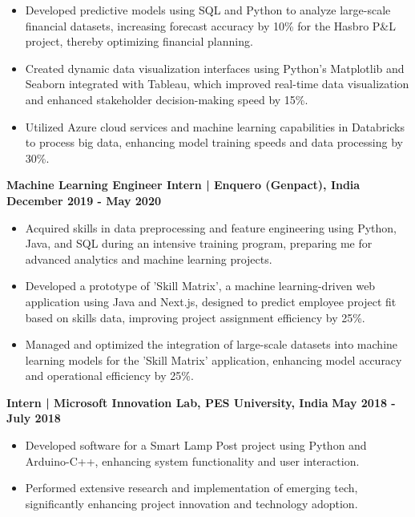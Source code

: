 \documentclass{article}
\begin{document}
\begin{itemize}[noitemsep,nolistsep,leftmargin=*]
\item {\small Developed predictive models using SQL and Python to analyze large-scale financial datasets, increasing forecast accuracy by 10\% for the Hasbro P&L project, thereby optimizing financial planning.}
\item {\small Created dynamic data visualization interfaces using Python's Matplotlib and Seaborn integrated with Tableau, which improved real-time data visualization and enhanced stakeholder decision-making speed by 15\%.}
\item {\small Utilized Azure cloud services and machine learning capabilities in Databricks to process big data, enhancing model training speeds and data processing by 30\%.}
\end{itemize}
\vspace{1mm}
\noindent \textbf{Machine Learning Engineer Intern | Enquero (Genpact), India} \hfill \textbf{December 2019 - May 2020}
\begin{itemize}[noitemsep,nolistsep,leftmargin=*]
\item {\small Acquired skills in data preprocessing and feature engineering using Python, Java, and SQL during an intensive training program, preparing me for advanced analytics and machine learning projects.}
\item {\small Developed a prototype of 'Skill Matrix', a machine learning-driven web application using Java and Next.js, designed to predict employee project fit based on skills data, improving project assignment efficiency by 25\%.}
\item {\small Managed and optimized the integration of large-scale datasets into machine learning models for the 'Skill Matrix' application, enhancing model accuracy and operational efficiency by 25\%.}
\end{itemize}
\vspace{1mm}
\noindent \textbf{Intern | Microsoft Innovation Lab, PES University, India} \hfill \textbf{May 2018 - July 2018}
\begin{itemize}[noitemsep,nolistsep,leftmargin=*]
\item {\small Developed software for a Smart Lamp Post project using Python and Arduino-C++, enhancing system functionality and user interaction.}
\item {\small Performed extensive research and implementation of emerging tech, significantly enhancing project innovation and technology adoption.}
\end{itemize}
\vspace{2mm} 
%
%
\end{document}
